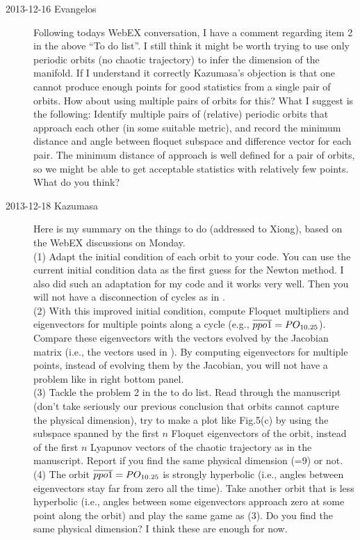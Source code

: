\begin{description}
\item[2013-12-16 Evangelos]
  Following todays WebEX conversation, I have a comment
  regarding item 2 in the above ``To do list''. I still think it might be worth trying
  to use only periodic orbits (no chaotic trajectory) to infer the dimension of
  the {\entangled} manifold. If I understand it correctly Kazumasa's objection is
  that one cannot produce enough points for good statistics
  from a single pair of orbits. How about using multiple pairs of orbits for this?
  What I suggest is the following: Identify multiple pairs of (relative)
  periodic orbits that approach each other (in some suitable metric),
  and record the minimum distance and angle between floquet subspace
  and difference vector for each pair. The minimum distance of approach is well
  defined for a pair of orbits, so we might be able to get acceptable statistics
  with relatively few points. What do you think?

\item[2013-12-18 Kazumasa]
  Here is my summary on the things to do (addressed to Xiong),
  based on the WebEX discussions on Monday.\\
  (1) Adapt the initial condition of each orbit to your code.
  You can use the current initial condition data
  as the first guess for the Newton method.
  I also did such an adaptation for my code and it works very well.
  Then you will not have a disconnection of cycles
  as in .\\
  (2) With this improved initial condition,
  compute Floquet multipliers and eigenvectors for multiple points
  along a cycle (e.g., ${\overline{ppo1}} = PO_{10.25}$).
  Compare these eigenvectors with the vectors evolved by the Jacobian matrix
  (i.e., the vectors used in ).
  By computing eigenvectors for multiple points,
  instead of evolving them by the Jacobian, you will not have a problem
  like in  right bottom panel.\\
  (3) Tackle the problem 2 in the to do list.
  Read through the manuscript \cite{TaCh11}
  (don't take seriously our previous conclusion
  that orbits cannot capture the physical dimension),
  try to make a plot like Fig.5(c)
  by using the subspace spanned by the first $n$ Floquet eigenvectors
  of the orbit,
  instead of the first $n$ Lyapunov vectors of the chaotic trajectory
  as in the manuscript.
  Report if you find the same physical dimension (=9) or not.\\
  (4) The orbit ${\overline{ppo1}} = PO_{10.25}$ is strongly hyperbolic
  (i.e., angles between eigenvectors stay far from zero all the time).
  Take another orbit that is less hyperbolic
  (i.e., angles between some eigenvectors approach zero
  at some point along the orbit)
  and play the same game as (3).
  Do you find the same physical dimension?
  I think these are enough for now.


\end{description}
